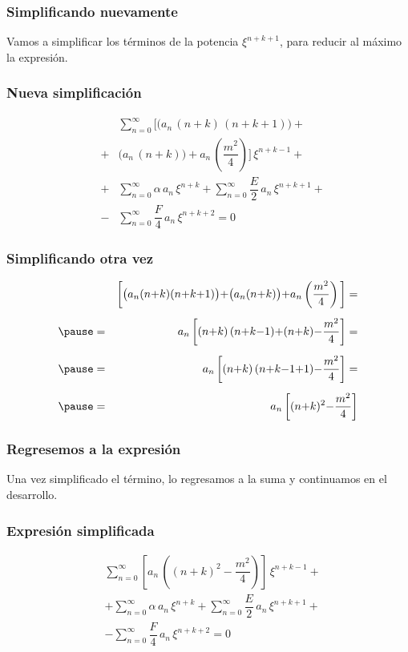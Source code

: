 \begin{frame}
\frametitle{Simplificando nuevamente}
Vamos a simplificar los términos de la potencia $\xi^{n+k+1}$, para reducir al máximo la expresión.
\end{frame}
\begin{frame}
\frametitle{Nueva simplificación}
\vspace{-1cm}
\begin{eqnarray*}
&{}& \sum_{n=0}^{\infty} \bigg[ \big( a_{n} \, (n {+} k) \, (n {+} k {+} 1) \big) + \\[0.5em]
&+& \big( a_{n} \, (n {+} k) \big) {+} a_{n} \, \left( \dfrac{m^{2}}{4} \right) \bigg] \, \xi^{n+k-1} + \\[0.5em] 
&+& \sum_{n=0}^{\infty} \alpha \, a_{n} \, \xi^{n+k} + \sum_{n=0}^{\infty} \dfrac{E}{2} \, a_{n} \, \xi^{n+k+1} + \\[0.5em] 
&-& \sum_{n=0}^{\infty} \dfrac{F}{4} \, a_{n} \, \xi^{n+k+2} = 0
\end{eqnarray*}
\end{frame}
\begin{frame}
\frametitle{Simplificando otra vez}
\vspace{-1cm}
\begin{eqnarray*}
&{}& \bigg[ \big( a_{n} (n {+} k) (n {+} k {+} 1) \big) {+} \big( a_{n} (n {+} k) \big) {+} a_{n} \left( \dfrac{m^{2}}{4} \right) \bigg] = \\[0.5em] \pause
&=& a_{n} \, \bigg[  (n {+} k) \, (n {+} k {-} 1) {+} (n {+} k) {-} \dfrac{m^{2}}{4} \bigg] = \\[0.5em] \pause
&=& a_{n} \, \bigg[  (n {+} k) \, (n {+} k {-} 1 {+} {1}) {-} \dfrac{m^{2}}{4} \bigg] = \\[0.5em] \pause
&=& a_{n} \, \bigg[  (n {+} k)^{2} {-} \dfrac{m^{2}}{4} \bigg]
\end{eqnarray*}
\end{frame}
\begin{frame}
\frametitle{Regresemos a la expresión}
Una vez simplificado el término, lo regresamos a la suma y continuamos en el desarrollo.
\end{frame}
\begin{frame}
\frametitle{Expresión simplificada}
\vspace{-1cm}
\begin{align*}
&{} \sum_{n=0}^{\infty} \left[ a_{n} \, \left( (n {+} k)^{2} {-} \dfrac{m^{2}}{4} \right) \right] \, \xi^{n+k-1} + \\[0.5em] 
&+ \sum_{n=0}^{\infty} \alpha \, a_{n} \, \xi^{n+k} + \sum_{n=0}^{\infty} \dfrac{E}{2} \, a_{n} \, \xi^{n+k+1} + \\[0.5em] 
&- \sum_{n=0}^{\infty} \dfrac{F}{4} \, a_{n} \, \xi^{n+k+2} = 0
\end{align*}
\end{frame}
